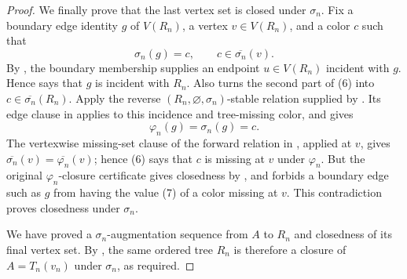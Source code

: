 \begin{proof}
We finally prove that the last vertex set is closed under $\sigma_n$.
Fix a boundary edge identity $g$ of $V(R_n)$, a vertex
$v\in V(R_n)$, and a color $c$ such that
\[
             \sigma_n(g)=c,
             \qquad c\in\overline{\sigma_n}(v).                \tag{6}
\]
By , the boundary membership supplies an endpoint
$u\in V(R_n)$ incident with $g$.  Hence  says
that $g$ is incident with $R_n$.  Also
 turns the second part of (6) into
$c\in\overline{\sigma_n}(R_n)$.  Apply the reverse
$(R_n,\varnothing,\sigma_n)$-stable relation supplied by
.  Its edge clause in  applies to
this incidence and tree-missing color, and gives
\[
                  \varphi_n(g)=\sigma_n(g)=c.                  \tag{7}
\]
The vertexwise missing-set clause of the forward relation in
, applied at $v$, gives
$\overline{\sigma_n}(v)=\overline{\varphi_n}(v)$; hence (6) says that
$c$ is missing at $v$ under $\varphi_n$.  But the original
$\varphi_n$-closure certificate gives closedness by
, and  forbids
a boundary edge such as $g$ from having the value (7) of a color missing
at $v$.  This contradiction proves closedness under $\sigma_n$.

We have proved a $\sigma_n$-augmentation sequence from $A$ to $R_n$ and
closedness of its final vertex set.  By , the
same ordered tree $R_n$ is therefore a closure of $A=T_n(v_n)$ under
$\sigma_n$, as required.
\end{proof}
